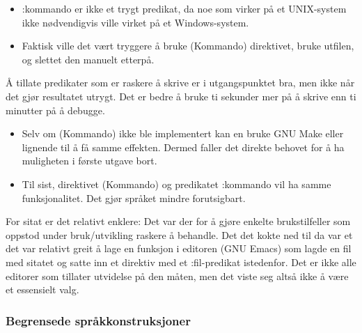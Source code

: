 \documentclass[11pt]{article}
\begin{document}
\begin{itemize}
\item :kommando er ikke et trygt predikat, da noe som virker på et UNIX-system ikke nødvendigvis ville virket på et Windows-system.
\end{itemize}





\begin{itemize}
\item Faktisk ville det vært tryggere å bruke (Kommando) direktivet, bruke utfilen, og slettet den manuelt etterpå.
\end{itemize}

   Å tillate predikater som er raskere å skrive er i utgangspunktet bra, men ikke når det gjør resultatet utrygt. Det er bedre å bruke ti sekunder mer på å skrive enn ti minutter på å debugge.




\begin{itemize}
\item Selv om (Kommando) ikke ble implementert kan en bruke GNU Make eller lignende til å få samme effekten. Dermed faller det direkte behovet for å ha muligheten i første utgave bort.
\end{itemize}





\begin{itemize}
\item Til sist, direktivet (Kommando) og predikatet :kommando vil ha samme funksjonalitet. Det gjør språket mindre forutsigbart.
\end{itemize}




For sitat er det relativt enklere: Det var der for å gjøre enkelte brukstilfeller som oppstod under bruk/utvikling raskere å behandle. Det det kokte ned til da var et det var relativt greit å lage en funksjon i editoren (GNU Emacs) som lagde en fil med sitatet og satte inn et direktiv med et :fil-predikat istedenfor.
Det er ikke alle editorer som tillater utvidelse på den måten, men det viste seg altså ikke å være et essensielt valg.



\subsubsection{Begrensede språkkonstruksjoner}
\end{document}
